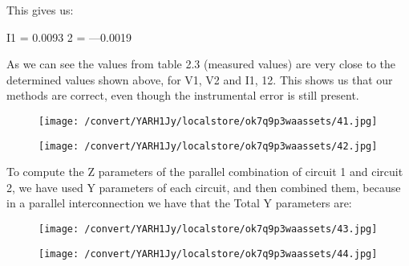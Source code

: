 \documentclass[12pt]{report}
\begin{document}
    This gives us: 

\vspace{10pt}

    I1 = 0.0093 2 = —0.0019 

\vspace{10pt}

    As we can see the values from table 2.3 (measured values) are very close  to the determined values shown above, for V1, V2 and I1, 12. This shows  us that our methods are correct, even though the instrumental error is still  present. 

\vspace{10pt}

\begin{figure}[h]

\texttt{[image: /convert/YARH1Jy/localstore/ok7q9p3waassets/41.jpg]}

\centering

\end{figure}

\begin{figure}[h]

\texttt{[image: /convert/YARH1Jy/localstore/ok7q9p3waassets/42.jpg]}

\centering

\end{figure}

    To compute the Z parameters of the parallel combination of circuit 1 and  circuit 2, we have used Y parameters of each circuit, and then combined them,  because in a parallel interconnection we have that the Total Y parameters  are: 

\vspace{10pt}

\begin{figure}[h]

\texttt{[image: /convert/YARH1Jy/localstore/ok7q9p3waassets/43.jpg]}

\centering

\end{figure}

\begin{figure}[h]

\texttt{[image: /convert/YARH1Jy/localstore/ok7q9p3waassets/44.jpg]}

\centering

\end{figure}

\par
\end{document}
